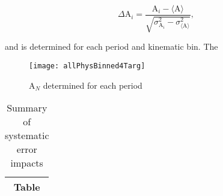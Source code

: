 \begin{equation}
  \Delta\mathrm{A}_i =
  \frac{
    \mathrm{A}_i - \langle \mathrm{A} \rangle
  }{
    \sqrt{
      \sigma^2_{\mathrm{A}_i} - \sigma^2_{\langle \mathrm{A} \rangle}
    }
  },
\end{equation}

\noindent
and is determined for each period and kinematic bin.  The 

\begin{figure}[h!]
  \begin{center}
    \texttt{[image: allPhysBinned4Targ]}
    \caption{A$_N$ determined for each period}
    \label{fig::allPhysBinned4Targ}
  \end{center}
\end{figure}

\begin{table}[h!t]
  \centering
  \begin{tabular}{|c|}
    \hline
    Table \\
    \hline
  \end{tabular}
  \caption{Summary of systematic error impacts}
  \label{tab::sysError}
\end{table}
